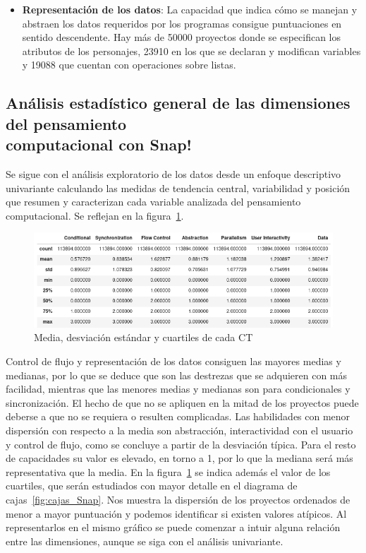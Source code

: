\documentclass[a4paper, 12pt]{book}
\begin{document}
\begin{itemize}
    \item \textbf{Representación de los datos}: La capacidad que indica cómo se manejan y abstraen los datos requeridos por los programas consigue puntuaciones en sentido descendente. Hay más de 50000 proyectos donde se especifican los atributos de los personajes, 23910 en los que se declaran y modifican variables y 19088 que cuentan con operaciones sobre listas. 
\end{itemize}    

\subsection{Análisis estadístico general de las dimensiones del pensamiento \\computacional con Snap!}
\label{subsec:estad_pc_Snap}

Se sigue con el análisis exploratorio de los datos desde un enfoque descriptivo univariante calculando las medidas de tendencia central, variabilidad y posición que resumen y caracterizan cada variable analizada del pensamiento computacional. Se reflejan en la figura~\ref{fig:describe_Snap}.

\begin{figure}[H]
    \centering
    \includegraphics[width=1\textwidth]{img/describe_Snap.png}
    \caption{Media, desviación estándar y cuartiles de cada CT}
    \label{fig:describe_Snap}
\end{figure}

Control de flujo y representación de los datos consiguen las mayores medias y medianas, por lo que se deduce que son las destrezas que se adquieren con más facilidad, mientras que las menores medias y medianas son para condicionales y sincronización. El hecho de que no se apliquen en la mitad de los proyectos puede deberse a que no se requiera o resulten complicadas. Las habilidades con menor dispersión con respecto a la media son abstracción, interactividad con el usuario y control de flujo, como se concluye a partir de la desviación típica. Para el resto de capacidades su valor es elevado, en torno a 1,
por lo que la mediana será más representativa que la media. En la figura~\ref{fig:describe_Snap} se indica además el valor de los cuartiles, que serán estudiados con mayor detalle en el diagrama de cajas~\ref{fig:cajas_Snap}.
Nos muestra la dispersión de los proyectos ordenados de menor a mayor puntuación y podemos identificar si existen valores atípicos. Al representarlos en el mismo gráfico se puede comenzar a intuir alguna relación entre las dimensiones, aunque se siga con el análisis univariante.
\end{document}
